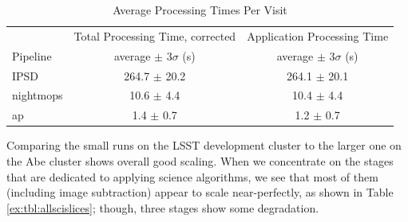 \begin{table}[ht]
\begin{center}
\caption{Average Processing Times Per Visit
\label{ex:tbl:visitstats}}
\vspace{\baselineskip}
\begin{tabular}{ l | c | c |}
\hline\hline
          & Total Processing Time, corrected
          & Application Processing Time \\ 
Pipeline  & average $\pm$  $3\sigma$ (s) & average $\pm$ $3\sigma$ (s) \\ \hline
IPSD      & 264.7 $\pm$ 20.2 & 264.1 $\pm$ 20.1  \\ 
nightmops & 10.6  $\pm$  4.4 & 10.4 $\pm$  4.4  \\ 
ap        & 1.4   $\pm$  0.7 & 1.2 $\pm$  0.7  \\ \hline
\hline
\end{tabular}

\end{center}
\end{table}

Comparing the small runs on the LSST development cluster to the larger
one on the Abe cluster shows overall good scaling.  When we
concentrate on the stages that are dedicated to applying science
algorithms, we see that most of them (including image subtraction)
appear to scale near-perfectly, as shown in
Table \ref{ex:tbl:allscislices}; though, three stages show some
degradation.  

